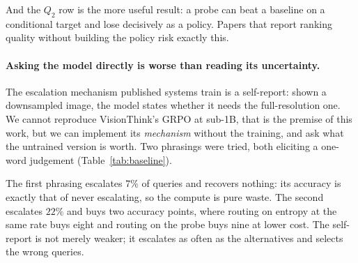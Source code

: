\documentclass[10pt,twocolumn]{article}
\theoremstyle{plain}
\begin{document}
And the $Q_2$ row is the more useful result: a probe can beat a baseline on a
conditional target and lose decisively as a policy. Papers that report ranking
quality without building the policy risk exactly this.

\paragraph{Asking the model directly is worse than reading its uncertainty.}
The escalation mechanism published systems train is a self-report: shown a
downsampled image, the model states whether it needs the full-resolution one.
We cannot reproduce VisionThink's GRPO at sub-1B, that is the premise of this work, but we can implement its \emph{mechanism} without the training, and ask
what the untrained version is worth. Two phrasings were tried, both eliciting a
one-word judgement (Table~\ref{tab:baseline}).

\begin{table}[t]
\centering\small
\setlength{\tabcolsep}{4pt}
\caption{Untrained self-report against uncertainty-based routing, $200$
held-out examples, latency in milliseconds. Against the stronger self-report
the probe is $+0.070\ [0.020, 0.120]$ more accurate and $25.8\ [11.9, 39.2]$\,ms
cheaper, both paired and both significant.}
\label{tab:baseline}
\end{table}

The first phrasing escalates $7\%$ of queries and recovers nothing: its accuracy
is exactly that of never escalating, so the compute is pure waste. The second
escalates $22\%$ and buys two accuracy points, where routing on entropy at the
same rate buys eight and routing on the probe buys nine at lower cost. The
self-report is not merely weaker; it escalates as often as the alternatives and
selects the wrong queries.
\end{document}
